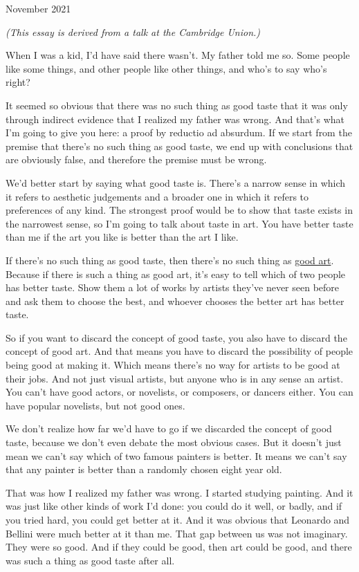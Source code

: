 November 2021

\emph{(This essay is derived from a talk at the Cambridge Union.)}

When I was a kid, I'd have said there wasn't. My father told me so. Some
people like some things, and other people like other things, and who's
to say who's right?

It seemed so obvious that there was no such thing as good taste that it
was only through indirect evidence that I realized my father was wrong.
And that's what I'm going to give you here: a proof by reductio ad
absurdum. If we start from the premise that there's no such thing as
good taste, we end up with conclusions that are obviously false, and
therefore the premise must be wrong.

We'd better start by saying what good taste is. There's a narrow sense
in which it refers to aesthetic judgements and a broader one in which it
refers to preferences of any kind. The strongest proof would be to show
that taste exists in the narrowest sense, so I'm going to talk about
taste in art. You have better taste than me if the art you like is
better than the art I like.

If there's no such thing as good taste, then there's no such thing as
\href{goodart.html}{good art}. Because if there is such a thing as good
art, it's easy to tell which of two people has better taste. Show them a
lot of works by artists they've never seen before and ask them to choose
the best, and whoever chooses the better art has better taste.

So if you want to discard the concept of good taste, you also have to
discard the concept of good art. And that means you have to discard the
possibility of people being good at making it. Which means there's no
way for artists to be good at their jobs. And not just visual artists,
but anyone who is in any sense an artist. You can't have good actors, or
novelists, or composers, or dancers either. You can have popular
novelists, but not good ones.

We don't realize how far we'd have to go if we discarded the concept of
good taste, because we don't even debate the most obvious cases. But it
doesn't just mean we can't say which of two famous painters is better.
It means we can't say that any painter is better than a randomly chosen
eight year old.

That was how I realized my father was wrong. I started studying
painting. And it was just like other kinds of work I'd done: you could
do it well, or badly, and if you tried hard, you could get better at it.
And it was obvious that Leonardo and Bellini were much better at it than
me. That gap between us was not imaginary. They were so good. And if
they could be good, then art could be good, and there was such a thing
as good taste after all.

